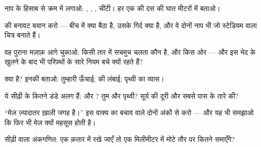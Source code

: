 \begin{exercise}[$\star$]\label{exo:g9:atoms-to-galaxies:1}
नाप के हिसाब से क्रम में लगाओ: , , , चींटी। हर एक की दस
की घात मीटरों में बताओ।
\end{exercise}

\begin{exercise}[$\star$]\label{exo:g9:atoms-to-galaxies:2}
 की बनावट बयान करो --- बीच में क्या बैठा है, उसके गिर्द क्या है,
और वे दोनों नाप भी जो स्टेडियम वाला चित्र बनाते हैं।
\end{exercise}

\begin{exercise}[$\star$]\label{exo:g9:atoms-to-galaxies:3}
वह पुराना मज़ाक़ आगे चुकाओ: किसी तार में सचमुच चलता कौन है, और किस ओर
--- और इस भेद के खुलने के बाद भी परिपथों के सारे नियम बचे क्यों रहते
हैं?
\end{exercise}

\begin{exercise}[$\star$]\label{exo:g9:atoms-to-galaxies:4}
 क्या है? इनकी  बताओ: तुम्हारी ऊँचाई;
 की लंबाई; पृथ्वी का व्यास।
\end{exercise}

\begin{exercise}[$\star$]\label{exo:g9:atoms-to-galaxies:5}
ये सीढ़ी के कितने डंडे अलग हैं:  और ? तुम और पृथ्वी? सूर्य
की दूरी और सबसे पास के तारे की?
\end{exercise}

\begin{exercise}[$\star$]\label{exo:g9:atoms-to-galaxies:6}
``मेज़ ज़्यादातर ख़ाली जगह है।'' इस वाक्य का बचाव  वाले दोनों
अंकों से करो --- और यह भी समझाओ कि फिर भी मेज़  क्यों महसूस होती
है।
\end{exercise}

\begin{exercise}[$\star$]\label{exo:g9:atoms-to-galaxies:7}
सीढ़ी वाला अंकगणित: एक क़तार में रखे जाएँ तो एक मिलीमीटर में मोटे तौर
पर कितने  समाएँगे?
\end{exercise}

